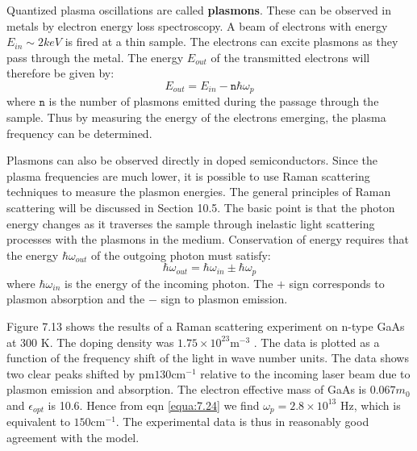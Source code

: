 \documentclass[12pt]{book}
\begin{document}
Quantized plasma oscillations are called \textbf{plasmons}. These can be observed in metals by electron energy loss spectroscopy. A beam of electrons with energy $E_{in}\sim2 keV$ is fired at a thin sample. The electrons can excite plasmons as they pass through the metal. The energy $E_{out}$ of the transmitted electrons
will therefore be given by:
\begin{equation}\label{equa:7.33}
  E_{out}=E_{in}-\texttt{n}\hbar\omega_p
\end{equation}
where $\texttt{n}$ is the number of plasmons emitted during the passage through the sample. Thus by measuring the energy of the electrons emerging, the plasma frequency can be determined.

Plasmons can also be observed directly in doped semiconductors. Since the plasma frequencies are much lower, it is possible to use Raman scattering techniques to measure the plasmon energies. The general principles of Raman scattering will be discussed in Section 10.5. The basic point is that the photon energy changes as it traverses the sample through inelastic light scattering processes with the plasmons in the medium. Conservation of energy requires that the energy $\hbar\omega_{out}$ of the outgoing photon must satisfy:
\begin{equation}\label{equa:7.34}
  \hbar\omega_{out}=\hbar\omega_{in}\pm\hbar\omega_p
\end{equation}
where $\hbar\omega_{in}$ is the energy of the incoming photon. The $+$ sign corresponds to plasmon absorption and the $-$ sign to plasmon emission.

Figure 7.13 shows the results of a Raman scattering experiment on n-type GaAs at 300 K. The doping density was $1.75\times10^{23}\mathrm{m^{-3}}$ . The data is plotted as a function of the frequency shift of the light in wave number units. The data shows two clear peaks shifted by $\mathrm{pm}130\mathrm{cm}^{-1}$ relative to the incoming laser beam due to plasmon emission and absorption. The electron effective mass of GaAs is $0.067m_0$ and $\epsilon_{opt}$ is 10.6. Hence from eqn \ref{equa:7.24} we find $\omega_p=2.8\times10^{13}$ Hz, which is equivalent to $150\mathrm{cm}^{-1}$. The experimental data is thus in reasonably good agreement with the model.
\end{document}
